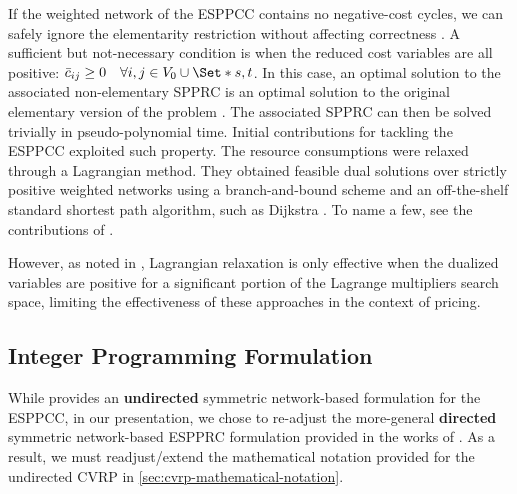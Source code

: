 If the weighted network of the ESPPCC contains no negative-cost cycles, we can safely ignore the elementarity restriction without affecting correctness \parencite{beasley1989}.
A sufficient but not-necessary condition is when the reduced cost variables are all positive: $\bar{c}_{ij} \ge 0 \quad \forall i, j \in V_0 \cup \Set*{s, t}$.
In this case, an optimal solution to the associated non-elementary SPPRC is an optimal solution to the original elementary version of the problem \parencite{beasley1989}.
The associated SPPRC can then be solved trivially in pseudo-polynomial time.
Initial contributions for tackling the ESPPCC exploited such property.
The resource consumptions were relaxed through a Lagrangian method.
They obtained feasible dual solutions over strictly positive weighted networks using a branch-and-bound scheme and an off-the-shelf standard shortest path algorithm, such as Dijkstra \parencite{sniedovich2006dijkstra}.
To name a few, see the contributions of \textcite{beasley1989, dumitrescu2003improved, carlyle2008, muhandiramge2009simultaneous}.

However, as noted in \textcite{righini2004}, Lagrangian relaxation is only effective when the dualized variables are positive for a significant portion of the Lagrange multipliers search space, limiting the effectiveness of these approaches in the context of pricing.

\subsection{Integer Programming Formulation}
\label{sec:espprc-integer-programming-formulation}

While \textcite{jepsen2008branchandcut} provides
an \textbf{undirected} symmetric network-based formulation for the ESPPCC,
in our presentation, we chose to re-adjust the more-general
\textbf{directed} symmetric network-based ESPPRC formulation
provided in the works of \textcite{beasley1989, toth2002, toth2014}.
As a result, we must readjust/extend the mathematical notation
provided for the undirected CVRP in \cref{sec:cvrp-mathematical-notation}.

\medskip

